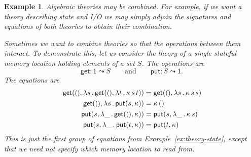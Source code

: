 \documentclass{amsart}
\newcommand{\lam}[1]{\lambda #1 \,.\,}
\newcommand{\opdecl}[3]{#1 : #2 \leadsto #3} %
\newcommand{\one}{\mathsf{1}} %
\newcommand{\unit}{{\text{\small$()$}}} %
\newcommand{\kode}[1]{\mathsf{#1}}
\newcommand{\opcall}[3]{\kode{#1}(#2, #3)}
\newtheorem{example}{Example}[section]
\begin{document}
\begin{example}
  \label{ex:theory-single-state}
  Algebraic theories may be combined. For example, if we want a theory
  describing state and I/O we may simply adjoin the signatures and equations of
  both theories to obtain their combination.

  Sometimes we want to combine theories so that the operations between them
  interact. To demonstrate this, let us consider the theory of a single stateful
  memory location holding elements of a set $S$. The operations are
  \begin{equation*}
    \opdecl{\kode{get}}{\one}{S}
    \qquad\text{and}\qquad
    \opdecl{\kode{put}}{S}{\one}.
  \end{equation*}
  The equations are
  \begin{align}
    \label{eq:state-get-get}%
    \opcall{get}{\unit}{
      \lam{s}{
        \opcall{get}{\unit}{
        \lam{t} \kappa \, s \, t}
      }
    } &=
    \opcall{get}{\unit}{\lam{s}{\kappa \, s \, s}}
    \\
    \label{eq:state-get-put}%
    \opcall{get}{\unit}{
      \lam{s} \opcall{put}{s}{\kappa}
    } &=
    \kappa \, ()
    \\
    \label{eq:state-put-get}%
    \opcall{put}{s}{
      \lam{\_} \opcall{get}{\unit}{\kappa}
    } &=
    \opcall{put}{s}{\lam{\_} \kappa \, s}
    \\
    \label{eq:state-put-put}%
    \opcall{put}{s}{
      \lam{\_} \opcall{put}{t}{\kappa}
    } &=
    \opcall{put}{t}{\kappa}
  \end{align}
  This is just the first group of equations from Example~\ref{ex:theory-state},
  except that we need not specify which memory location to read from.


\end{example}
\end{document}
